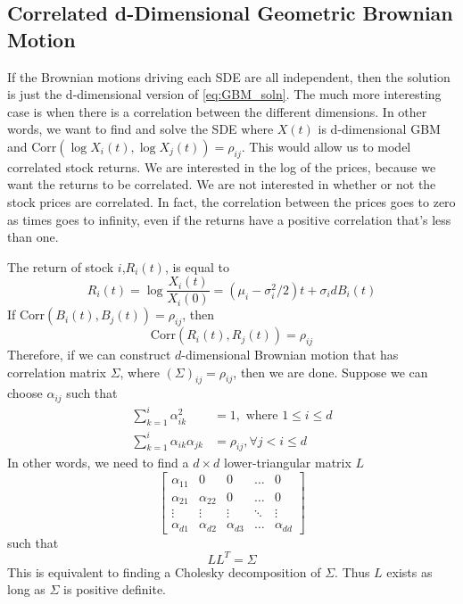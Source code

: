 \documentclass{amsart}
\theoremstyle{definition}
\theoremstyle{remark}
\begin{document}
\subsection{Correlated d-Dimensional Geometric Brownian Motion}\label{corr_gmb}
If the Brownian motions driving each SDE are all independent, then the solution is just the d-dimensional version of \eqref{eq:GBM_soln}. The much more interesting case is when there is a correlation between the different dimensions. In other words, we want to find and solve the SDE where $X(t)$ is d-dimensional GBM and $\text{Corr}(\log X_i(t), \log X_j(t)) = \rho_{ij}$. This would allow us to model correlated stock returns. We are interested in the log of the prices, because we want the returns to be correlated. We are not interested in whether or not the stock prices are correlated. In fact, the correlation between the prices goes to zero as times goes to infinity, even if the returns have a positive correlation that's less than one.

The return of stock $i$,$R_i(t)$, is equal to
\begin{equation*}
R_i(t) = \log \frac{X_i(t)}{X_i(0)} = (\mu_i-\sigma_i^2/2)t +\sigma_i dB_i(t)
\end{equation*}
If Corr$(B_i(t),B_j(t)) = \rho_{ij}$, then
\begin{equation*}
\text{Corr}(R_i(t),R_j(t)) = \rho_{ij}
\end{equation*}
Therefore, if we can construct $d$-dimensional Brownian motion that has correlation matrix $\Sigma$, where $(\Sigma)_{ij} = \rho_{ij}$, then we are done. Suppose we can choose $\alpha_{ij}$ such that
\begin{align*}
\sum_{k=1}^i \alpha_{ik}^2 &= 1, \text{ where } 1\le i\le d\\
\sum_{k=1}^i \alpha_{ik}\alpha_{jk}&= \rho_{ij}, \forall j < i \le d
\end{align*}
In other words, we need to find a $d\times d$ lower-triangular matrix $L$
\begin{equation*}
\begin{bmatrix}
    \alpha_{11} & 0 & 0 & \dots  & 0 \\
    \alpha_{21} & \alpha_{22} & 0 & \dots  & 0 \\
    \vdots & \vdots & \vdots & \ddots & \vdots \\
    \alpha_{d1} & \alpha_{d2} & \alpha_{d3}& \dots  & \alpha_{dd}
\end{bmatrix}
\end{equation*}
such that
\begin{equation*}
L L^T = \Sigma
\end{equation*}
This is equivalent to finding a Cholesky decomposition of $\Sigma$. Thus $L$ exists as long as $\Sigma$ is positive definite.
\end{document}
